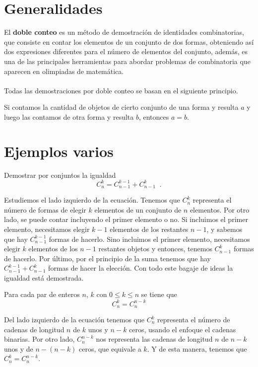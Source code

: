 \documentclass[12pt]{article}
\begin{document}
\section{Generalidades}
El \textbf{doble conteo} es un método de demostración de identidades combinatorias, que consiste en contar los elementos de un conjunto de dos formas, obteniendo así dos expresiones diferentes para el número de elementos del conjunto, además, es una de las principales herramientas para abordar problemas de combinatoria que aparecen en
olimpiadas de matemática.\\\\
Todas las demostraciones por doble conteo se basan en el siguiente principio.
\begin{definicion}
Si contamos la cantidad de objetos de cierto conjunto de una forma y resulta $a$ y luego las contamos de otra forma y resulta $b$, entonces $a = b$.
\end{definicion}
\section{Ejemplos varios}
\begin{ejemplo}
Demostrar por conjuntos la igualdad
\[C^k_n=C^{k-1}_{n-1}+C^k_{n-1}\;\;.
\]
\end{ejemplo}
\begin{solucion}
Estudiemos el lado izquierdo de la ecuación. Tenemos que $\displaystyle C^k_n$ representa el número de formas de elegir $k$ elementos de un conjunto de $n$ elementos. Por otro lado, se puede contar incluyendo el primer elemento o no. Si incluimos el primer elemento, necesitamos elegir $k-1$ elementos de los restantes $n-1$, y sabemos que hay $\displaystyle C_{n-1}^{k-1}$ formas de hacerlo. Sino incluimos el primer elemento, necesitamos elegir $k$ elementos de los $n-1$ restantes objetos y entonces, tenemos $\displaystyle C^{k}_{n-1}$ formas de hacerlo. Por último, por el principio de la suma tenemos que hay $\displaystyle C^{k-1}_{n-1}+C^k_{n-1}$ formas de hacer la elección. Con todo este bagaje de ideas la igualdad está demostrada.
\end{solucion}
\begin{ejemplo}
    Para cada par de enteros $n$, $k$ con $0\leq k\leq n$ se tiene que
    \[C^k_n=C^{n-k}_n\]
\end{ejemplo}
\begin{solucion}
Del lado izquierdo de la ecuación tenemos que $\displaystyle C^k_n$ representa el número de cadenas de longitud $n$ de $k$ unos y $n-k$ ceros, usando el enfoque el cadenas binarias. Por otro lado, $\displaystyle C^{n-k}_n$ nos representa las cadenas de longitud $n$ de $n-k$ unos y de $n-(n-k)$ ceros, que equivale a $k$. Y de esta manera, tenemos que $\displaystyle C^k_n=C^{n-k}_n$.
\end{solucion}
\end{document}
